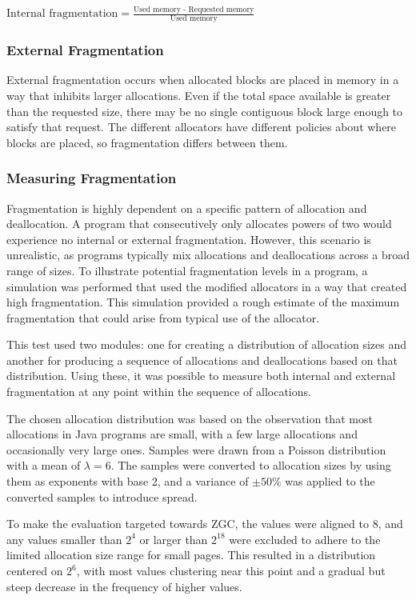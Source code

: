 $\text{Internal fragmentation} = \frac{\text{Used memory - Requested memory}}{\text{Used memory}}$

\subsubsection{External Fragmentation}
External fragmentation occurs when allocated blocks are placed in memory in a way that inhibits larger allocations. Even if the total space available is greater than the requested size, there may be no single contiguous block large enough to satisfy that request. The different allocators have different policies about where blocks are placed, so fragmentation differs between them.

\subsubsection{Measuring Fragmentation}
Fragmentation is highly dependent on a specific pattern of allocation and deallocation. A program that consecutively only allocates powers of two would experience no internal or external fragmentation. However, this scenario is unrealistic, as programs typically mix allocations and deallocations across a broad range of sizes. To illustrate potential fragmentation levels in a program, a simulation was performed that used the modified allocators in a way that created high fragmentation. This simulation provided a rough estimate of the maximum fragmentation that could arise from typical use of the allocator.

This test used two modules: one for creating a distribution of allocation sizes and another for producing a sequence of allocations and deallocations based on that distribution. Using these, it was possible to measure both internal and external fragmentation at any point within the sequence of allocations.

The chosen allocation distribution was based on the observation that most allocations in Java programs are small, with a few large allocations and occasionally very large ones. Samples were drawn from a Poisson distribution with a mean of $\lambda = 6$. The samples were converted to allocation sizes by using them as exponents with base 2, and a variance of $\pm 50\%$ was applied to the converted samples to introduce spread.

To make the evaluation targeted towards ZGC, the values were aligned to $8$, and any values smaller than $2^4$ or larger than $2^{18}$ were excluded to adhere to the limited allocation size range for small pages. This resulted in a distribution centered on $2^6$, with most values clustering near this point and a gradual but steep decrease in the frequency of higher values.

